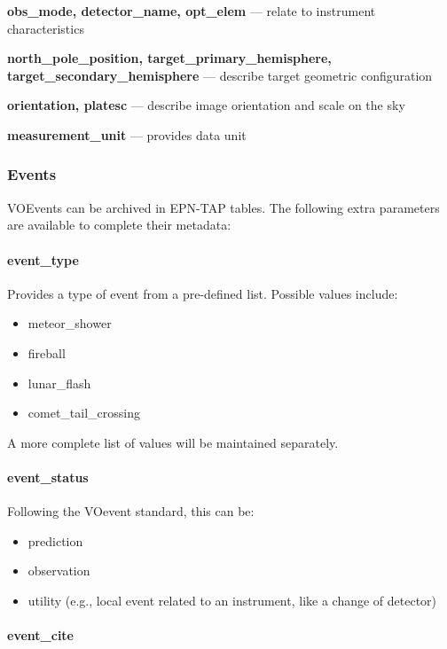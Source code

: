 \documentclass[11pt,a4paper]{ivoa}
\begin{document}
\textbf{obs\_mode, detector\_name, opt\_elem } --- relate to instrument
characteristics

\textbf{north\_pole\_position, target\_primary\_hemisphere,
target\_secondary\_hemisphere} --- describe target geometric configuration

\textbf{orientation, platesc} --- describe image orientation and scale on the sky

\textbf{measurement\_unit} --- provides data unit

\subsubsection{Events}


VOEvents \citep{2006ivoa.spec.1101S} can be archived in EPN-TAP tables.
The following extra parameters are available to complete their metadata:

\paragraph{event\_type}

Provides a type of event from a pre-defined list.
Possible values include:

\begin{itemize}
\item meteor\_shower
\item fireball
\item lunar\_flash
\item comet\_tail\_crossing
\end{itemize}

A more complete list of values will be maintained separately.

\paragraph{event\_status}

Following the VOevent standard, this can be:

\begin{itemize}
\item prediction
\item observation
\item utility (e.g., local event related to an instrument,
      like a change of detector)
\end{itemize}

\paragraph{event\_cite}
\end{document}
